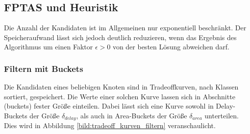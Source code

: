 \documentclass[11pt, a4paper, german]{article}
\begin{document}
\subsection{FPTAS und Heuristik}
\label{subsec:fptas}
Die Anzahl der Kandidaten ist im Allgemeinen nur exponentiell beschränkt. Der Speicheraufwand lässt sich jedoch deutlich reduzieren, wenn das Ergebnis des Algorithmus um einen Faktor $\epsilon > 0$ von der besten Lösung abweichen darf. \\

\subsubsection{Filtern mit Buckets}
\label{subsubsec:filtern}
Die Kandidaten eines beliebigen Knoten sind in Tradeoffkurven, nach Klassen sortiert, gespeichert. Die Werte einer solchen Kurve lassen sich in Abschnitte (buckets) fester Größe einteilen. Dabei lässt sich eine Kurve sowohl in Delay-Buckets  der Größe $\delta_{delay}$, als auch in Area-Buckets der Größe $\delta_{area}$ unterteilen. Dies wird in Abbildung \ref{bild:tradeoff_kurven_filtern} veranschaulicht.\\
\end{document}
